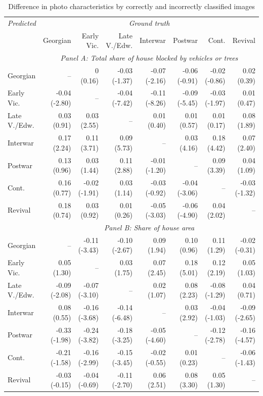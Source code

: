 \documentclass[]{article}
\begin{document}
\begin{table}[!htb] 
\caption{Difference in photo characteristics by correctly and incorrectly classified images} 
\label{tab:diffimgchar} 
\centering 
\begingroup\scriptsize 
\begin{tabular}{lrrrrrrr}

\toprule 

\emph{Predicted} & \multicolumn{7}{c}{\emph{Ground truth}} \\ 
  \cmidrule(lr){2-8} 
& Georgian & Early Vic. & Late V./Edw. & Interwar & Postwar & Cont. & Revival \\  

 \cmidrule(lr){2-8} 
 & \multicolumn{7}{c}{\emph{ Panel A: Total share of house blocked by vehicles or trees}}\\ 
\cmidrule(lr){1-1} \cmidrule(lr){2-8} 

Georgian &  -- &  0 (0.16) & -0.03 (-1.37) & -0.07 (-2.16) & -0.06 (-0.91) & -0.02 (-0.86) &  0.02 (0.39) \\  
  Early Vic. & -0.04 (-2.80) &  -- & -0.04 (-7.42) & -0.11 (-8.26) & -0.09 (-5.45) & -0.03 (-1.97) &  0.01 (0.47) \\  
  Late V./Edw. &  0.03 (0.91) &  0.03 (2.55) &  -- &  0.01 (0.40) &  0.01 (0.57) &  0.01 (0.17) &  0.08 (1.89) \\  
  Interwar &  0.17 (2.24) &  0.11 (3.71) &  0.09 (5.73) &  -- &  0.03 (4.16) &  0.18 (4.42) &  0.07 (2.40) \\  
  Postwar &  0.13 (0.96) &  0.03 (1.44) &  0.11 (2.88) & -0.01 (-1.20) &  -- &  0.09 (3.39) &  0.04 (1.09) \\  
  Cont. &  0.16 (0.77) & -0.02 (-1.91) &  0.03 (1.14) & -0.03 (-0.92) & -0.04 (-3.06) &  -- & -0.03 (-1.32) \\  
  Revival &  0.18 (0.74) &  0.03 (0.92) &  0.01 (0.26) & -0.05 (-3.03) & -0.06 (-4.90) &  0.04 (2.02) &  -- \\  

\cmidrule(lr){1-1} \cmidrule(lr){2-8} 
 & \multicolumn{7}{c}{\emph{ Panel B: Share of house area}}\\ 
\cmidrule(lr){1-1} \cmidrule(lr){2-8} 

  Georgian &  -- & -0.11 (-3.43) & -0.10 (-2.67) &  0.09 (1.94) &  0.10 (0.96) &  0.11 (1.29) & -0.02 (-0.31) \\  
  Early Vic. &  0.05 (1.30) &  -- &  0.03 (1.75) &  0.07 (2.45) &  0.18 (5.01) &  0.12 (2.19) &  0.05 (1.03) \\  
  Late V./Edw. & -0.09 (-2.08) & -0.07 (-3.10) &  -- &  0.02 (1.07) &  0.08 (2.23) & -0.08 (-1.29) &  0.04 (0.71) \\  
  Interwar &  0.08 (0.55) & -0.16 (-3.68) & -0.14 (-6.48) &  -- &  0.03 (2.92) & -0.04 (-1.03) & -0.09 (-2.65) \\  
  Postwar & -0.33 (-1.98) & -0.24 (-3.82) & -0.18 (-3.25) & -0.05 (-4.60) &  -- & -0.12 (-2.78) & -0.16 (-4.57) \\  
  Cont. & -0.21 (-1.58) & -0.16 (-2.99) & -0.15 (-3.45) & -0.02 (-0.55) &  0.01 (0.23) &  -- & -0.06 (-1.43) \\  
  Revival & -0.03 (-0.15) & -0.04 (-0.69) & -0.11 (-2.70) &  0.06 (2.51) &  0.08 (3.30) &  0.05 (1.30) &  -- \\  


\end{tabular}
\end{table}
\end{document}
